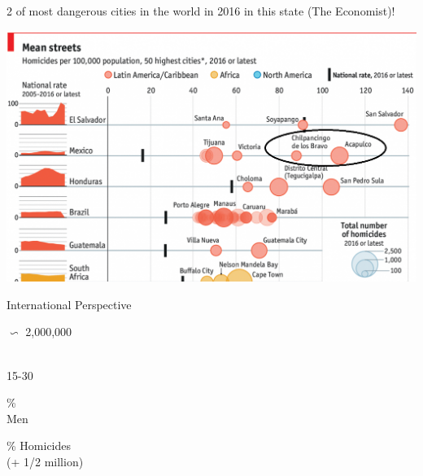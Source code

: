 \documentclass[xcolor={dvipsnames}]{beamer}
\begin{document}
\begin{frame}

\Large{
2 of most dangerous cities in the world in 2016 in this state (The Economist)!

				\begin{center}
		\includegraphics[scale=.38]{Figures/Capture}
				\end{center}				

}
\end{frame}


\begin{frame}
\Huge{
\begin{center}
International Perspective \linebreak \\

{\fontsize{70}{80}\selectfont 

 $\backsim$ 2,000,000}\\
15-30

\end{center}
}
\end{frame}

\begin{frame}
\Huge{
\begin{center}
{\fontsize{70}{80}\%}\\
Men

\end{center}
}
\end{frame}


\begin{frame}
\Huge{
\begin{center}
{\fontsize{70}{80}\% Homicides}\\
(+ 1/2 million)

\end{center}
}
\end{frame}
\end{document}
